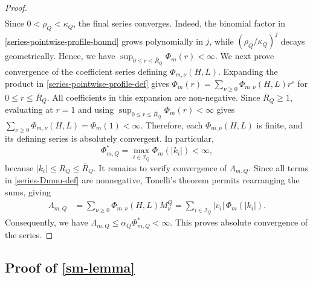\documentclass[10pt,reqno]{article}
\numberwithin{equation}{section}
\theoremstyle{plain}
\theoremstyle{definition}
\begin{document}
\begin{proof}
\begin{align}
\end{align}
Since \(0<\rho_Q<\kappa_Q\), the final series converges. Indeed, the binomial factor in \cref{series-pointwise-profile-bound} grows polynomially in \(j\), while \((\rho_Q/\kappa_Q)^j\) decays geometrically. Hence, we have
$\sup_{0\leq r\leq \overline R_Q}\Phi_m(r)<\infty$. 
We next prove convergence of the coefficient series defining \(\Phi_{m,\nu}(H,L)\). Expanding the product in \cref{series-pointwise-profile-def} gives $\Phi_m(r)=\sum_{\nu\geq 0} \Phi_{m,\nu}(H,L)r^\nu$ for \(0\leq r\leq \overline R_Q\). All coefficients in this expansion are non-negative. Since \(\overline R_Q\geq 1\), evaluating at \(r=1\) and using $\sup_{0\leq r\leq \overline R_Q}\Phi_m(r)<\infty$ gives $\sum_{\nu\geq 0} \Phi_{m,\nu}(H,L) = \Phi_m(1) <\infty$. Therefore, each \(\Phi_{m,\nu}(H,L)\) is finite, and its defining series is absolutely convergent. In particular,
\begin{equation}
\label{series-Phi-star-finite}
\Phi_{m,Q}^* = \max_{i\in\mathcal I_Q}\Phi_m(|k_i|) <\infty ,
\end{equation}
because \(|k_i|\leq R_Q\leq \overline R_Q\). It remains to verify convergence of \(\Lambda_{m,Q}\). Since all terms in \cref{series-Dmnu-def} are nonnegative, Tonelli's theorem permits rearranging the sums, giving
\begin{align}
\label{series-Lambda-Tonelli}
\Lambda_{m,Q} &= \sum_{\nu\geq 0}\Phi_{m,\nu}(H,L)M_\nu^Q = \sum_{i\in\mathcal I_Q}|v_i|\, \Phi_m(|k_i|).
\end{align}
Consequently, we have $\Lambda_{m,Q} \leq \alpha_Q\Phi_{m,Q}^* <\infty$. This proves absolute convergence of the series.
\end{proof}



\subsection{Proof of \cref{sm-lemma}}\label{proof-of-sm-lemma}
\end{document}

